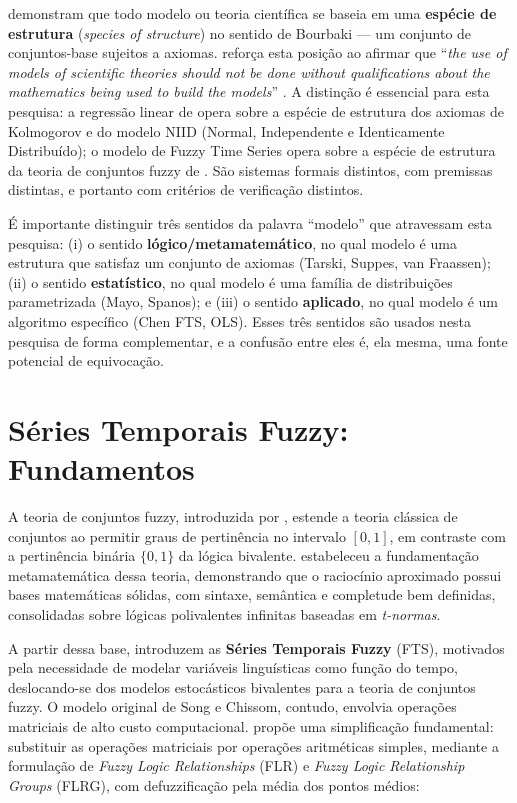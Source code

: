 \documentclass[
    12pt,
    oneside,
    openany,
    a4paper,
    english,
    brazil
]{abntex2}
\theoremstyle{definition}
\begin{document}
 demonstram que todo modelo ou teoria científica se baseia em uma \textbf{espécie de estrutura} (\textit{species of structure}) no sentido de Bourbaki --- um conjunto de conjuntos-base sujeitos a axiomas.  reforça esta posição ao afirmar que ``\textit{the use of models of scientific theories should not be done without qualifications about the mathematics being used to build the models}'' \cite[p.~39]{krause2022models}. A distinção é essencial para esta pesquisa: a regressão linear de  opera sobre a espécie de estrutura dos axiomas de Kolmogorov e do modelo NIID (Normal, Independente e Identicamente Distribuído); o modelo de Fuzzy Time Series opera sobre a espécie de estrutura da teoria de conjuntos fuzzy de . São sistemas formais distintos, com premissas distintas, e portanto com critérios de verificação distintos.

É importante distinguir três sentidos da palavra ``modelo'' que atravessam esta pesquisa: (i) o sentido \textbf{lógico/metamatemático}, no qual modelo é uma estrutura que satisfaz um conjunto de axiomas (Tarski, Suppes, van Fraassen); (ii) o sentido \textbf{estatístico}, no qual modelo é uma família de distribuições parametrizada (Mayo, Spanos); e (iii) o sentido \textbf{aplicado}, no qual modelo é um algoritmo específico (Chen FTS, OLS). Esses três sentidos são usados nesta pesquisa de forma complementar, e a confusão entre eles é, ela mesma, uma fonte potencial de equivocação.

\section{Séries Temporais Fuzzy: Fundamentos}
\label{sec:fts}

A teoria de conjuntos fuzzy, introduzida por , estende a teoria clássica de conjuntos ao permitir graus de pertinência no intervalo $[0,1]$, em contraste com a pertinência binária $\{0,1\}$ da lógica bivalente.  estabeleceu a fundamentação metamatemática dessa teoria, demonstrando que o raciocínio aproximado possui bases matemáticas sólidas, com sintaxe, semântica e completude bem definidas, consolidadas sobre lógicas polivalentes infinitas baseadas em \textit{t-normas}.

A partir dessa base,  introduzem as \textbf{Séries Temporais Fuzzy} (FTS), motivados pela necessidade de modelar variáveis linguísticas como função do tempo, deslocando-se dos modelos estocásticos bivalentes para a teoria de conjuntos fuzzy. O modelo original de Song e Chissom, contudo, envolvia operações matriciais de alto custo computacional.  propõe uma simplificação fundamental: substituir as operações matriciais por operações aritméticas simples, mediante a formulação de \textit{Fuzzy Logic Relationships} (FLR) e \textit{Fuzzy Logic Relationship Groups} (FLRG), com defuzzificação pela média dos pontos médios:
\end{document}
